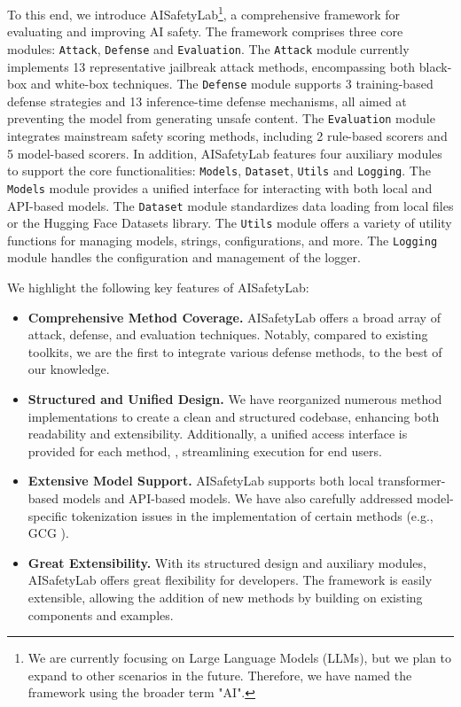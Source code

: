 To this end, we introduce AISafetyLab\footnote{We are currently focusing on Large Language Models (LLMs), but we plan to expand to other scenarios in the future. Therefore, we have named the framework using the broader term "AI".}, a comprehensive framework for evaluating and improving AI safety. The framework comprises three core modules: \texttt{Attack}, \texttt{Defense} and \texttt{Evaluation}. The \texttt{Attack} module currently implements 13 representative jailbreak attack methods, encompassing both black-box and white-box techniques. The \texttt{Defense} module supports 3 training-based defense strategies and 13 inference-time defense mechanisms, all aimed at preventing the model from generating unsafe content. The \texttt{Evaluation} module integrates mainstream safety scoring methods, including 2 rule-based scorers and 5 model-based scorers. In addition, AISafetyLab features four auxiliary modules to support the core functionalities: \texttt{Models}, \texttt{Dataset}, \texttt{Utils} and \texttt{Logging}. The \texttt{Models} module provides a unified interface for interacting with both local and API-based models. The \texttt{Dataset} module standardizes data loading from local files or the Hugging Face Datasets library. The \texttt{Utils} module offers a variety of utility functions for managing models, strings, configurations, and more. The \texttt{Logging} module handles the configuration and management of the logger.

We highlight the following key features of AISafetyLab:
\begin{itemize}
    \item \textbf{Comprehensive Method Coverage.} AISafetyLab offers a broad array of attack, defense, and evaluation techniques. Notably, compared to existing toolkits, we are the first to integrate various defense methods, to the best of our knowledge. 
    \item \textbf{Structured and Unified Design.} We have reorganized numerous method implementations to create a clean and structured codebase, enhancing both readability and extensibility. Additionally, a unified access interface is provided for each method, , streamlining execution for end users.
    \item \textbf{Extensive Model Support.} AISafetyLab supports both local transformer-based models and API-based models. We have also carefully addressed model-specific tokenization issues in the implementation of certain methods (e.g., GCG \cite{DBLP:journals/corr/abs-2307-15043}).
    \item \textbf{Great Extensibility.} With its structured design and auxiliary modules, AISafetyLab offers great flexibility for developers. The framework is easily extensible, allowing the addition of new methods by building on existing components and examples.
\end{itemize}

